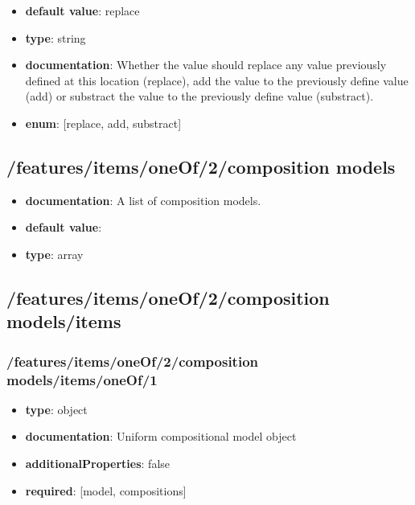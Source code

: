\begin{itemize}\item {\bf default value}: replace
\item {\bf type}: string
\item {\bf documentation}: Whether the value should replace any value previously defined at this location (replace), add the value to the previously define value (add) or substract the value to the previously define value (substract).
\item {\bf enum}: [replace, add, substract]\end{itemize}\subsection{/features/items/oneOf/2/composition models}
\begin{itemize}\item {\bf documentation}: A list of composition models.
\item {\bf default value}: 
\item {\bf type}: array
\end{itemize}\subsection{/features/items/oneOf/2/composition models/items}

\subsubsection{/features/items/oneOf/2/composition models/items/oneOf/1}
\begin{itemize}\item {\bf type}: object
\item {\bf documentation}: Uniform compositional model object
\item {\bf additionalProperties}: false
\item {\bf required}: [model, compositions]\end{itemize}
